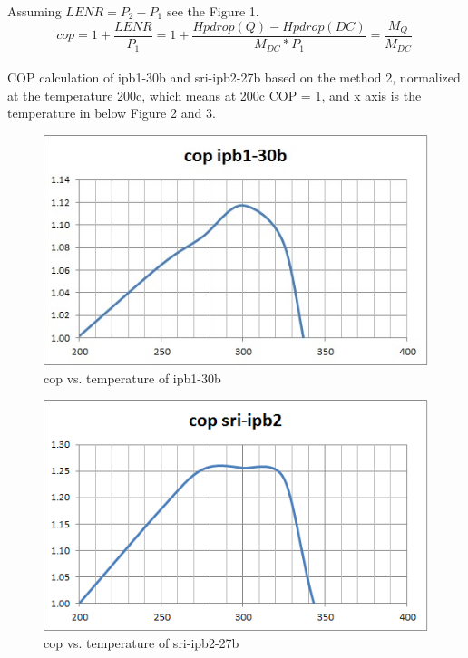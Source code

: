 \documentclass{article}
\begin{document}
Assuming $LENR = P_{2}-P_{1}$ see the Figure 1. 
\begin{equation}
cop=1+\frac{LENR}{P_{1}}=1+\frac{Hpdrop(Q)-Hpdrop(DC)}{M_{DC}*P_{1}}= \frac{M_{Q}}{M_{DC}} \ \label{4}%
\end{equation}
\\
COP calculation of ipb1-30b and sri-ipb2-27b based on the method 2, normalized at the temperature 200c, which means at 200c COP = 1, and x axis is the temperature in below Figure 2 and 3. 
\begin{figure}
[h]
\includegraphics[scale=1.0]{ipb1-30b-cop.jpg} 
\caption{cop vs. temperature of ipb1-30b}%
\end{figure}

\begin{figure}
\includegraphics[scale=1.0]{sri-ipb2-27b-cop.png} 
\caption{cop vs. temperature of sri-ipb2-27b}%
\end{figure} 
\end{document}
